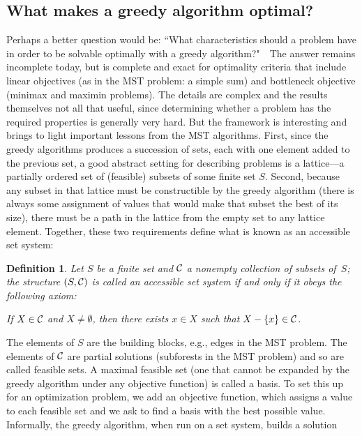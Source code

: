 \documentclass[11pt]{article}
\newtheorem{definition}{Definition}
\begin{document}
\subsection{What makes a greedy algorithm optimal?}
Perhaps a better question would be: ``What characteristics should a problem
have in order to be solvable optimally with a greedy algorithm?"\ \ 
The answer remains incomplete today, but is complete and exact for optimality
criteria that include linear objectives (as in the MST problem: a simple sum)
and bottleneck objective (minimax and maximin problems).  The details are
complex and the results themselves not all that useful, since determining
whether a problem has the required properties is generally very hard.
But the framework is interesting and brings to light important lessons from
the MST algorithms.  First, since the greedy algorithms produces a succession
of sets, each with one element added to the previous set, a good abstract
setting for describing problems is a lattice---a partially ordered set of
(feasible) subsets of some finite set $S$.  Second, because any subset in
that lattice must be constructible by the greedy algorithm (there is always
some assignment of values that would make that subset the best of its size),
there must be a path in the lattice from the empty set to any lattice element.
Together, these two requirements define what is known as an accessible
set system:
\begin{definition}
  Let $S$ be a finite set and $\cal C$ a nonempty collection of subsets of~$S$;
the structure $(S,{\cal C})$ is called an \emph{accessible set system} if and
only if it obeys the following axiom:
  \begin{description}
    \itemsep 0pt
    \item[\it (accessibility axiom)]
      If $X \in {\cal C}$ and $X \not= \emptyset$, then there exists $x \in X$
      such that $X-\{x\} \in {\cal C}$.
  \end{description}
\end{definition}
The elements of $S$ are the building blocks, e.g., edges in the MST problem.
The elements of $\cal C$ are partial solutions (subforests in the MST problem)
and so are called feasible sets.  A maximal feasible set (one that cannot be
expanded by the greedy algorithm under any objective function) is called
a basis.  To set this up for an optimization problem, we add an objective
function, which assigns a value to each feasible set and we ask to find
a basis with the best possible value.
Informally, the greedy algorithm, when run on a set system, builds a solution
\end{document}

